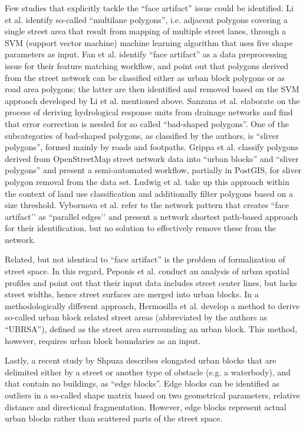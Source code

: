 Few studies that explicitly tackle the ``face artifact'' issue could be identified. Li et al.
\cite{li_polygon-based_2014} identify so-called ``multilane polygons'', i.e. adjacent
polygons covering a single street area that result from mapping of multiple street
lanes, through a SVM (support vector machine) machine learning algorithm that uses five
shape parameters as input. Fan et al. \cite{fan_polygon-based_2016} identify ``face artifact''
as a data preprocessing issue for their feature matching workflow, and point out that
polygons derived from the street network can be classified either as urban block
polygons or as road area polygons; the latter are then identified and removed based on
the SVM approach developed by Li et al. \cite{li_polygon-based_2014} mentioned above.
Sanzana et al. \cite{sanzana_decomposition_2018} elaborate on the process of deriving
hydrological response units from drainage networks and find that error correction is
needed for so called ``bad-shaped polygons''. One of the subcategories of bad-shaped
polygons, as classified by the authors, is ``sliver polygons'', formed mainly by roads
and footpaths. Grippa et al. \cite{grippa_mapping_2018} classify polygons derived from
OpenStreetMap street network data into ``urban blocks'' and ``sliver polygons'' and
present a semi-automated workflow, partially in PostGIS, for sliver polygon removal from
the data set. Ludwig et al. \cite{ludwig_mapping_2021} take up this approach within the
context of land use classification and additionally filter polygons based on a size
threshold. Vybornova et al. \cite{vybornova_automated_2022} refer to the network pattern
that creates ``face artifact’’ as ``parallel edges’’ and present a network shortest path-based
approach for their identification, but no solution to effectively remove these from the
network.

Related, but not identical to ``face artifact'' is the problem of formalization of street
space. In this regard, Peponis et al. \cite{peponis_measuring_2007} conduct an analysis
of urban spatial profiles and point out that their input data includes street center
lines, but lacks street widths, hence street surfaces are merged into urban blocks. In a
methodologically different approach, Hermosilla et al. \cite{hermosilla_using_2014}
develop a method to derive so-called urban block related street areas (abbreviated by
the authors as ``UBRSA''), defined as the street area surrounding an urban block. This
method, however, requires urban block boundaries as an input.

Lastly, a recent study by Shpuza \cite{shpuza_shape_2022} describes elongated urban
blocks that are delimited either by a street or another type of obstacle (e.g. a
waterbody), and that contain no buildings, as ``edge blocks''. Edge blocks can be
identified as outliers in a so-called shape matrix based on two geometrical parameters,
relative distance and directional fragmentation. However, edge blocks represent actual
urban blocks rather than scattered parts of the street space.

